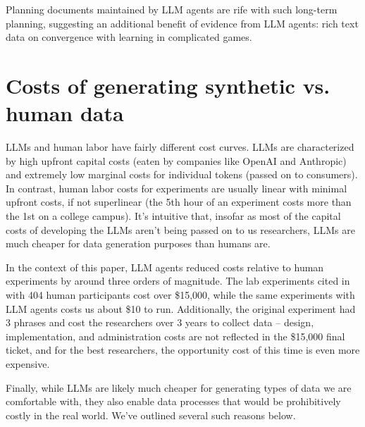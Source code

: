 \documentclass{article} %
\begin{document}
Planning documents maintained by LLM agents are rife with such long-term planning, suggesting an additional benefit of evidence from LLM agents: rich text data on convergence with learning in complicated games.


\section{Costs of generating synthetic vs. human data}
LLMs and human labor have fairly different cost curves. LLMs are characterized by high upfront capital costs (eaten by companies like OpenAI and Anthropic) and extremely low marginal costs for individual tokens (passed on to consumers). In contrast, human labor costs for experiments are usually linear with minimal upfront costs, if not superlinear (the 5th hour of an experiment costs more than the 1st on a college campus). It's intuitive that, insofar as most of the capital costs of developing the LLMs aren't being passed on to us researchers, LLMs are much cheaper for data generation purposes than humans are.

In the context of this paper, LLM agents reduced costs relative to human experiments by around three orders of magnitude. The lab experiments cited in \cite{li2017obviously} with 404 human participants cost over \$15,000, while the same experiments with LLM agents costs us about \$10 to run. Additionally, the original experiment had 3 phrases and cost the researchers over 3 years to collect data -- design, implementation, and administration costs are not reflected in the \$15,000 final ticket, and for the best researchers, the opportunity cost of this time is even more expensive.

Finally, while LLMs are likely much cheaper for generating types of data we are comfortable with, they also enable data processes that would be prohibitively costly in the real world. We've outlined several such reasons below.
\end{document}
